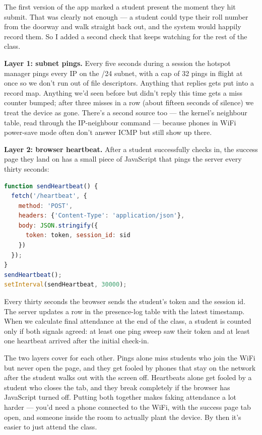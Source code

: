 \documentclass[sigconf,10pt]{acmart}
\begin{document}
The first version of the app marked a student present the moment
they hit submit. That was clearly not enough --- a student could
type their roll number from the doorway and walk straight back out,
and the system would happily record them. So I added a second
check that keeps watching for the rest of the class.

\textbf{Layer 1: subnet pings.} Every five seconds during a session
the hotspot manager pings every IP on the /24 subnet, with a cap
of 32 pings in flight at once so we don't run out of file
descriptors. Anything that replies gets put into a record map.
Anything we'd seen before but didn't reply this time gets a miss
counter bumped; after three misses in a row (about fifteen seconds
of silence) we treat the device as gone. There's a second source
too --- the kernel's neighbour table, read through the IP-neighbour
command --- because phones in WiFi power-save mode often don't
answer ICMP but still show up there.

\textbf{Layer 2: browser heartbeat.} After a student successfully
checks in, the success page they land on has a small piece of
JavaScript that pings the server every thirty seconds:

\begin{lstlisting}[language=JavaScript]
function sendHeartbeat() {
  fetch('/heartbeat', {
    method: 'POST',
    headers: {'Content-Type': 'application/json'},
    body: JSON.stringify({
      token: token, session_id: sid
    })
  });
}
sendHeartbeat();
setInterval(sendHeartbeat, 30000);
\end{lstlisting}

Every thirty seconds the browser sends the student's token and
the session id. The server updates a row in the presence-log
table with the latest timestamp. When we calculate final
attendance at the end of the class, a student is counted only if
both signals agreed: at least one ping sweep saw their token and
at least one heartbeat arrived after the initial check-in.

The two layers cover for each other. Pings alone miss students
who join the WiFi but never open the page, and they get fooled by
phones that stay on the network after the student walks out with
the screen off. Heartbeats alone get fooled by a student who
closes the tab, and they break completely if the browser has
JavaScript turned off. Putting both together makes faking
attendance a lot harder --- you'd need a phone connected to the
WiFi, with the success page tab open, and someone inside the room
to actually plant the device. By then it's easier to just attend
the class.
\end{document}
